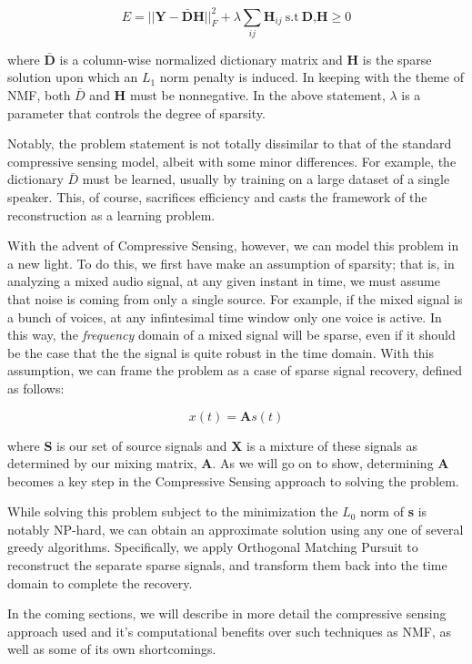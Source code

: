 \documentclass{article}
\begin{document}
$$ E = ||\textbf{Y} - \bar{\textbf{D}}\textbf{H}||^{2}_{F} + \lambda\sum\limits_{ij}\textbf{H}_{ij}\ \text{s.t}\ \textbf{D,H} \ge 0 $$

where $\bar{\textbf{D}}$ is a column-wise normalized dictionary matrix and \textbf{H} is the sparse solution upon which an $L_{1}$ norm penalty is induced. In keeping with the theme of NMF, both $\bar{D}$ and \textbf{H} must be nonnegative. In the above statement, $\lambda$ is a parameter that controls the degree of sparsity.

Notably, the problem statement is not totally dissimilar to that of the standard compressive sensing model, albeit with some minor differences. For example, the dictionary $\bar{D}$ must be learned, usually by training on a large dataset of a single speaker. This, of course, sacrifices efficiency and casts the framework of the reconstruction as a learning problem.  

With the advent of Compressive Sensing, however, we can model this problem in a new light. To do this, we first have make an assumption of sparsity; that is, in analyzing a mixed audio signal, at any given instant in time, we must assume that noise is coming from only a single source. For example, if the mixed signal is a bunch of voices, at any infintesimal time window only one voice is active. In this way, the {\it frequency} domain of a mixed signal will be sparse, even if it should be the case that the the signal is quite robust in the time domain. With this assumption, we can frame the problem as a case of sparse signal recovery, defined as follows:

$$ x(t) = \textbf{A}s(t) $$

where \textbf{S} is our set of source signals and \textbf{X} is a mixture of these signals as determined by our mixing matrix, \textbf{A}. As we will go on to show, determining \textbf{A} becomes a key step in the Compressive Sensing approach to solving the problem.

While solving this problem subject to the minimization the $L_{0}$ norm of \textbf{s} is notably NP-hard, we can obtain an approximate solution using any one of several greedy algorithms. Specifically, we apply Orthogonal Matching Pursuit to reconstruct the separate sparse signals, and transform them back into the time domain to complete the recovery.

In the coming sections, we will describe in more detail the compressive sensing approach used and it's computational benefits over such techniques as NMF, as well as some of its own shortcomings.
\end{document}
